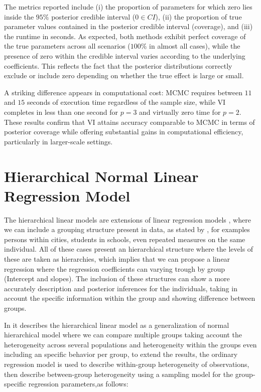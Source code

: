 \newpage

The metrics reported include (i) the proportion of parameters for which zero lies inside the $95\%$ posterior 
credible interval ($0 \in CI$), (ii) the proportion of true parameter values contained in the posterior 
credible interval (coverage), and (iii) the runtime in seconds. As expected, both methods exhibit perfect 
coverage of the true parameters across all scenarios ($100\%$ in almost all cases), while the presence of zero 
within the credible interval varies according to the underlying coefficients. This reflects the fact that the 
posterior distributions correctly exclude or include zero depending on whether the true effect is large or small. 

\vspace{0.5cm}

A striking difference appears in computational cost: MCMC requires between $11$ and $15$ seconds of execution 
time regardless of the sample size, while VI completes in less than one second for $p=3$ and virtually zero 
time for $p=2$. These results confirm that VI attains accuracy comparable to MCMC in terms of posterior 
coverage while offering substantial gains in computational efficiency, particularly in larger-scale settings.

\section{Hierarchical Normal Linear Regression Model}

The hierarchical linear models are extensions of linear regression models , where we can include a grouping structure present in data, as stated by
\cite{GELMAN}  , for examples persons within cities, students in schools, even repeated measures on the same individual. All of these cases present an hierarchical structure where the levels of these are taken as hierarchies, which implies that we can propose a linear regression where the regression coefficients can varying trough by group (Intercept and slopes). The inclusion of these structures can show a more accurately description and posterior inferences for the individuals, taking in account the specific information within the group and showing difference between groups.

\newpage

In \cite{HOFF} it describes the hierarchical linear model as a generalization of normal hierarchical model where we can compare multiple groups taking account the heterogeneity across several populations and  heterogeneity within the groups even including an specific behavior per group, to extend the results, the ordinary regression model is used to describe within-group heterogeneity of observations, then describe between-group heterogeneity using a sampling model for the group-specific regression parameters,as follows:

